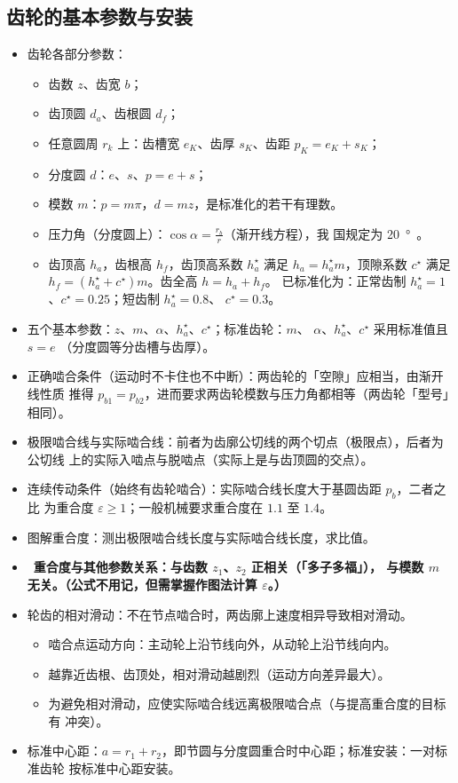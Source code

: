 \documentclass[12pt,a4paper]{article}
\newcommand{\tightlist}{\setlength{\parskip}{0pt}\setlength{\itemsep}{0pt}}
\newcommand{\hint}[1]{\textsf{（#1）}}
\renewcommand{\emph}[1]{\faIcon[regular]{lightbulb}\ \textbf{#1}}
\begin{document}
\subsection{齿轮的基本参数与安装}
\begin{itemize}\tightlist
    \item 齿轮各部分参数：
    \begin{itemize}\tightlist
        \item 齿数 $z$、齿宽 $b$；
        \item 齿顶圆 $d_a$、齿根圆 $d_f$；
        \item 任意圆周 $r_k$ 上：齿槽宽 $e_K$、齿厚 $s_K$、齿距 $p_K=e_K+s_K$；
        \item 分度圆 $d$：$e$、$s$、$p=e+s$；
        \item 模数 $m$：$p=m\pi$，$d=mz$，是标准化的若干有理数。
        \item 压力角\hint{分度圆上}：$\cos\alpha=\frac{r_b}r$\hint{渐开线方程}，我
        国规定为 \SI{20}\degree。
        \item 齿顶高 $h_a$，齿根高 $h_f$，齿顶高系数 $h^\star_a$ 满足 $h_a=h^\star_a
        m$，顶隙系数 $c^\star$ 满足 $h_f=(h^\star_a+c^\star)m$。齿全高 $h=h_a+h_f$。
        已标准化为：正常齿制 $h^\star_a=1$、$c^\star=0.25$；短齿制 $h^\star_a=0.8$、
        $c^\star=0.3$。  
    \end{itemize}
    \item 五个基本参数：$z$、$m$、$\alpha$、$h^\star_a$、$c^\star$；标准齿轮：$m$、
    $\alpha$、$h^\star_a$、$c^\star$ 采用标准值且 $s=e$ \hint{分度圆等分齿槽与齿厚}。
    \item 正确啮合条件\hint{运动时不卡住也不中断}：两齿轮的「空隙」应相当，由渐开线性质
    推得 $p_{b1}=p_{b2}$，进而要求两齿轮模数与压力角都相等\hint{两齿轮「型号」相同}。
    \item 极限啮合线与实际啮合线：前者为齿廓公切线的两个切点\hint{极限点}，后者为公切线
    上的实际入啮点与脱啮点\hint{实际上是与齿顶圆的交点}。
    \item 连续传动条件\hint{始终有齿轮啮合}：实际啮合线长度大于基圆齿距 $p_b$，二者之比
    为重合度 $\varepsilon\geq1$；一般机械要求重合度在 $1.1$ 至 $1.4$。
    \item 图解重合度：测出极限啮合线长度与实际啮合线长度，求比值。
    \item \emph{重合度与其他参数关系：与齿数 $z_1$、$z_2$ 正相关\hint{「多子多福」}，
    与模数 $m$ 无关。\hint{公式不用记，但需掌握作图法计算 $\varepsilon$。}}
    \item 轮齿的相对滑动：不在节点啮合时，两齿廓上速度相异导致相对滑动。
    \begin{itemize}\tightlist
        \item 啮合点运动方向：主动轮上沿节线向外，从动轮上沿节线向内。
        \item 越靠近齿根、齿顶处，相对滑动越剧烈\hint{运动方向差异最大}。
        \item 为避免相对滑动，应使实际啮合线远离极限啮合点\hint{与提高重合度的目标有
        冲突}。
    \end{itemize}
    \item 标准中心距：$a=r_1+r_2$，即节圆与分度圆重合时中心距；标准安装：一对标准齿轮
    按标准中心距安装。
\end{itemize}
\end{document}
